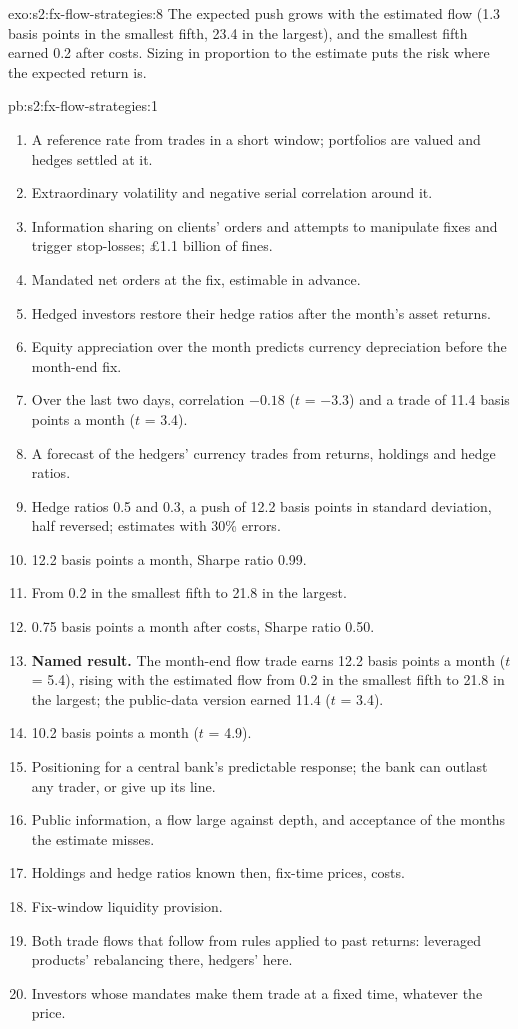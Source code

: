 \begin{solution}{exo:s2:fx-flow-strategies:8}
The expected push grows with the estimated flow (1.3 basis points in the smallest fifth, 23.4 in the largest), and the smallest fifth earned 0.2 after
costs. Sizing in proportion to the estimate puts the risk where the expected return is.
\end{solution}

\begin{solution}{pb:s2:fx-flow-strategies:1}
\begin{enumerate}
\item A reference rate from trades in a short window; portfolios are valued and hedges settled at it.
\item Extraordinary volatility and negative serial correlation around it.
\item Information sharing on clients' orders and attempts to manipulate fixes and trigger stop-losses; \pounds1.1 billion of fines.
\item Mandated net orders at the fix, estimable in advance.
\item Hedged investors restore their hedge ratios after the month's asset returns.
\item Equity appreciation over the month predicts currency depreciation before the month-end fix.
\item Over the last two days, correlation $-0.18$ ($t$ = $-3.3$) and a trade of 11.4 basis points a month ($t$ = 3.4).
\item A forecast of the hedgers' currency trades from returns, holdings and hedge ratios.
\item Hedge ratios 0.5 and 0.3, a push of 12.2 basis points in standard deviation, half reversed; estimates with 30\% errors.
\item 12.2 basis points a month, Sharpe ratio 0.99.
\item From 0.2 in the smallest fifth to 21.8 in the largest.
\item 0.75 basis points a month after costs, Sharpe ratio 0.50.
\item \textbf{Named result.} The month-end flow trade earns 12.2 basis points a month ($t$ = 5.4), rising with the estimated flow from 0.2 in the
smallest fifth to 21.8 in the largest; the public-data version earned 11.4 ($t$ = 3.4).
\item 10.2 basis points a month ($t$ = 4.9).
\item Positioning for a central bank's predictable response; the bank can outlast any trader, or give up its line.
\item Public information, a flow large against depth, and acceptance of the months the estimate misses.
\item Holdings and hedge ratios known then, fix-time prices, costs.
\item Fix-window liquidity provision.
\item Both trade flows that follow from rules applied to past returns: leveraged products' rebalancing there, hedgers' here.
\item Investors whose mandates make them trade at a fixed time, whatever the price.
\end{enumerate}
\end{solution}

